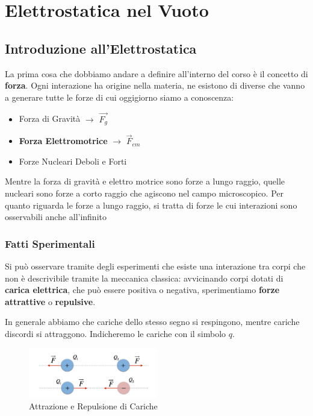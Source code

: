 \chapter{ Elettrostatica nel Vuoto}

\section{Introduzione all'Elettrostatica}
La prima cosa che dobbiamo andare a definire all'interno del corso è il concetto di \textbf{forza}. Ogni interazione ha origine nella materia, ne esistono di diverse che vanno a generare tutte le forze di cui oggigiorno siamo a conoscenza:

\begin{itemize}
	\item Forza di Gravità $\rightarrow$ $\vec{F_g}$
	\item \textbf{Forza Elettromotrice} $\rightarrow$ $\vec{F}_{em}$
	\item Forze Nucleari Deboli e Forti 
\end{itemize}

Mentre la forza di gravità e elettro motrice sono forze a lungo raggio, quelle nucleari sono forze a corto raggio che agiscono nel campo microscopico. Per quanto riguarda le forze a lungo raggio, si tratta di forze le cui interazioni sono osservabili anche all'infinito

\subsection{Fatti Sperimentali}
Si può osservare tramite degli esperimenti che esiste una interazione tra corpi che non è descrivibile tramite la meccanica classica: avvicinando corpi dotati di \textbf{carica elettrica}, che può essere positiva o negativa, sperimentiamo \textbf{forze attrattive} o \textbf{repulsive}.

In generale abbiamo che cariche dello stesso segno si respingono, mentre cariche discordi si attraggono. Indicheremo le cariche con il simbolo $q$. 
\begin{figure}[ht]
	\begin{center}
		\includegraphics[width=0.5\textwidth]{./Media/Coulomb.png}
		\caption{Attrazione e Repulsione di Cariche}
	\end{center}
\end{figure}

